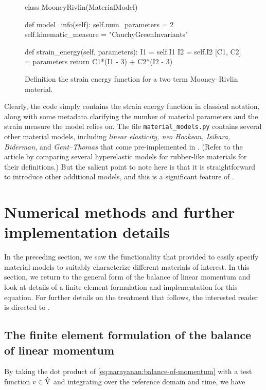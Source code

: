 \begin{figure}[!ht]
\begin{python}
class MooneyRivlin(MaterialModel)

  def model_info(self):
    self.num_parameters = 2
    self.kinematic_measure = "CauchyGreenInvariants"

  def strain_energy(self, parameters):
    I1 = self.I1
    I2 = self.I2
    [C1, C2] = parameters
    return C1*(I1 - 3) + C2*(I2 - 3)
\end{python}
\caption{Definition the strain energy function for a two term
  Mooney--Rivlin material.}
\label{code:narayanan:mr}
\end{figure}

\noindent Clearly, the code simply contains the strain energy function
in classical notation, along with some metadata clarifying the number
of material parameters and the strain measure the model relies on. The
file {\tt material\_models.py} contains several other material models,
including {\em linear elasticity, neo Hookean, Isihara, Biderman,} and
{\em Gent--Thomas} that come pre-implemented in \twist. (Refer to the
article by \cite{MarckmannVerron2006} comparing several hyperelastic
models for rubber-like materials for their definitions.) But the
salient point to note here is that it is straightforward to introduce
other additional models, and this is a significant feature of \twist.

\section{Numerical methods and further implementation details}

In the preceding section, we saw the functionality that \twist{}
provided to easily specify material models to suitably characterize
different materials of interest. In this section, we return to the
general form of the balance of linear momentum and look at details of
a finite element formulation and implementation for this equation. For
further details on the treatment that follows, the interested reader
is directed to \cite{SimoHughes1998}.

\subsection{The finite element formulation of the balance of linear
  momentum}

By taking the dot product of
\eqref{eq:narayanan:balance-of-momentum} with a test function
$\mbox{$ v$} \in \hat{\mathrm{V}}$ and integrating over the reference domain
and time, we have

